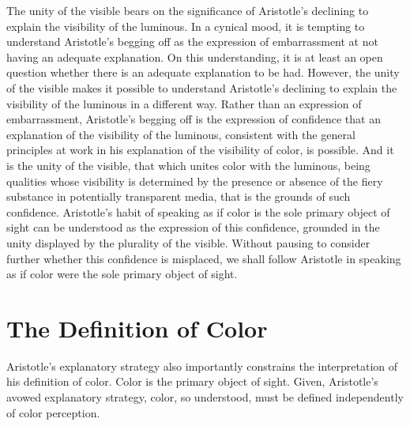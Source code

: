 The unity of the visible bears on the significance of Aristotle's declining to explain the visibility of the luminous. In a cynical mood, it is tempting to understand Aristotle's begging off as the expression of embarrassment at not having an adequate explanation. On this understanding, it is at least an open question whether there is an adequate explanation to be had. However, the unity of the visible makes it possible to understand Aristotle's declining to explain the visibility of the luminous in a different way. Rather than an expression of embarrassment, Aristotle's begging off is the expression of confidence that an explanation of the visibility of the luminous, consistent with the general principles at work in his explanation of the visibility of color, is possible. And it is the unity of the visible, that which unites color with the luminous, being qualities whose visibility is determined by the presence or absence of the fiery substance in potentially transparent media, that is the grounds of such confidence. Aristotle's habit of speaking as if color is the sole primary object of sight can be understood as the expression of this confidence, grounded in the unity displayed by the plurality of the visible. Without pausing to consider further whether this confidence is misplaced, we shall follow Aristotle in speaking as if color were the sole primary object of sight.


\section{The Definition of Color} %
\label{sec:the_definition_of_color}

Aristotle's explanatory strategy also importantly constrains the interpretation of his definition of color. Color is the primary object of sight. Given, Aristotle's avowed explanatory strategy, color, so understood, must be defined independently of color perception.

